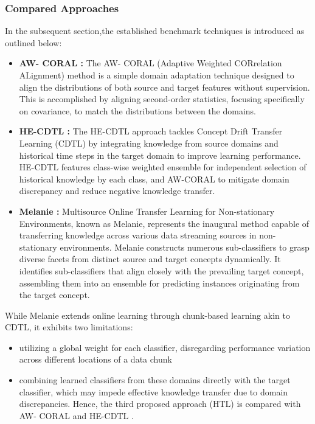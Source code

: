  \subsubsection{Compared Approaches}
  In the subsequent section,the established benchmark techniques is introduced as outlined below:
  \begin{itemize}
    \item \textbf{AW- CORAL \cite{sun2016return}:} The AW- CORAL (Adaptive Weighted CORrelation ALignment) method is a simple domain adaptation technique designed to align the distributions of both source and target features without supervision. This is accomplished by aligning second-order statistics, focusing specifically on covariance, to match the distributions between the domains.
    \item \textbf{HE-CDTL \cite{sun2016return}:} The HE-CDTL approach tackles Concept Drift Transfer Learning (CDTL) by integrating knowledge from source domains and historical time steps in the target domain to improve learning performance. HE-CDTL features class-wise weighted ensemble for independent selection of historical knowledge by each class, and AW-CORAL to mitigate domain discrepancy and reduce negative knowledge transfer.
    \item \textbf{Melanie \cite{dong2019multistream}:} Multisource Online Transfer Learning for Non-stationary Environments, known as Melanie, represents the inaugural method capable of transferring knowledge across various data streaming sources in non-stationary environments. Melanie constructs numerous sub-classifiers to grasp diverse facets from distinct source and target concepts dynamically. It identifies sub-classifiers that align closely with the prevailing target concept, assembling them into an ensemble for predicting instances originating from the target concept.
  \end{itemize}

While Melanie extends online learning through chunk-based learning akin to CDTL, it exhibits two limitations: 
\begin{itemize}
  \item utilizing a global weight for each classifier, disregarding performance variation across different locations of a data chunk
  \item combining learned classifiers from these domains directly with the target classifier, which may impede effective knowledge transfer due to domain discrepancies. Hence, the third proposed approach (HTL) is compared with AW- CORAL \cite{sun2016return} and HE-CDTL \cite{yang2021concept}.
\end{itemize}

